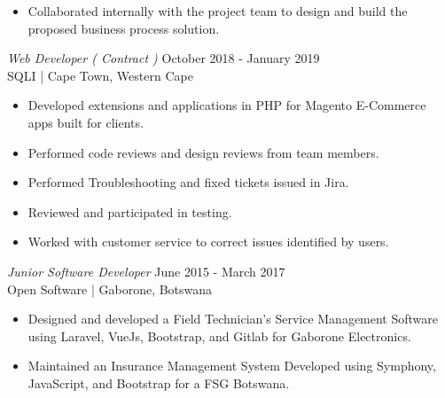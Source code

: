 \documentclass[margin, 10pt]{res}
\begin{document}
\begin{resume}
\begin{itemize}
\item Collaborated internally with the project team to design and build the
proposed business process solution.

\end{itemize} 

{\sl Web Developer ( Contract ) } \hfill October 2018 - January 2019 \\
SQLI | Cape Town, Western Cape 
\begin{itemize} 
\item Developed extensions and applications in PHP for Magento E-Commerce apps built for clients.
\item Performed code reviews and design reviews from team members.
\item Performed Troubleshooting and fixed tickets issued in Jira.
\item Reviewed and participated in testing.
\item Worked with customer service to correct issues identified by users.
\end{itemize} 

{\sl Junior Software Developer} \hfill June 2015 - March 2017 \\
Open Software | Gaborone, Botswana
\begin{itemize} \itemsep -2pt %
\item Designed and developed a Field Technician's Service Management Software using Laravel, VueJs, Bootstrap, and Gitlab for Gaborone Electronics.
\item Maintained an Insurance Management System Developed using Symphony, JavaScript, and Bootstrap for a FSG Botswana.
\end{itemize}
 

\end{resume}
\end{document}
